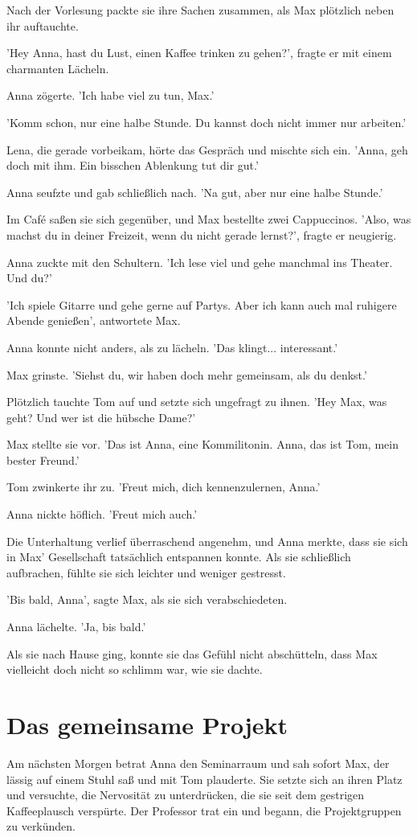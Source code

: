 \documentclass[12pt]{article}
\begin{document}
Nach der Vorlesung packte sie ihre Sachen zusammen, als Max plötzlich neben ihr auftauchte. 

'Hey Anna, hast du Lust, einen Kaffee trinken zu gehen?', fragte er mit einem charmanten Lächeln. 

Anna zögerte. 'Ich habe viel zu tun, Max.' 

'Komm schon, nur eine halbe Stunde. Du kannst doch nicht immer nur arbeiten.' 

Lena, die gerade vorbeikam, hörte das Gespräch und mischte sich ein. 'Anna, geh doch mit ihm. Ein bisschen Ablenkung tut dir gut.' 

Anna seufzte und gab schließlich nach. 'Na gut, aber nur eine halbe Stunde.' 

Im Café saßen sie sich gegenüber, und Max bestellte zwei Cappuccinos. 'Also, was machst du in deiner Freizeit, wenn du nicht gerade lernst?', fragte er neugierig. 

Anna zuckte mit den Schultern. 'Ich lese viel und gehe manchmal ins Theater. Und du?' 

'Ich spiele Gitarre und gehe gerne auf Partys. Aber ich kann auch mal ruhigere Abende genießen', antwortete Max. 

Anna konnte nicht anders, als zu lächeln. 'Das klingt... interessant.' 

Max grinste. 'Siehst du, wir haben doch mehr gemeinsam, als du denkst.' 

Plötzlich tauchte Tom auf und setzte sich ungefragt zu ihnen. 'Hey Max, was geht? Und wer ist die hübsche Dame?' 

Max stellte sie vor. 'Das ist Anna, eine Kommilitonin. Anna, das ist Tom, mein bester Freund.' 

Tom zwinkerte ihr zu. 'Freut mich, dich kennenzulernen, Anna.' 

Anna nickte höflich. 'Freut mich auch.' 

Die Unterhaltung verlief überraschend angenehm, und Anna merkte, dass sie sich in Max' Gesellschaft tatsächlich entspannen konnte. Als sie schließlich aufbrachen, fühlte sie sich leichter und weniger gestresst. 

'Bis bald, Anna', sagte Max, als sie sich verabschiedeten. 

Anna lächelte. 'Ja, bis bald.' 

Als sie nach Hause ging, konnte sie das Gefühl nicht abschütteln, dass Max vielleicht doch nicht so schlimm war, wie sie dachte.

\section{ Das gemeinsame Projekt }
 Am nächsten Morgen betrat Anna den Seminarraum und sah sofort Max, der lässig auf einem Stuhl saß und mit Tom plauderte. Sie setzte sich an ihren Platz und versuchte, die Nervosität zu unterdrücken, die sie seit dem gestrigen Kaffeeplausch verspürte. Der Professor trat ein und begann, die Projektgruppen zu verkünden.
\end{document}
